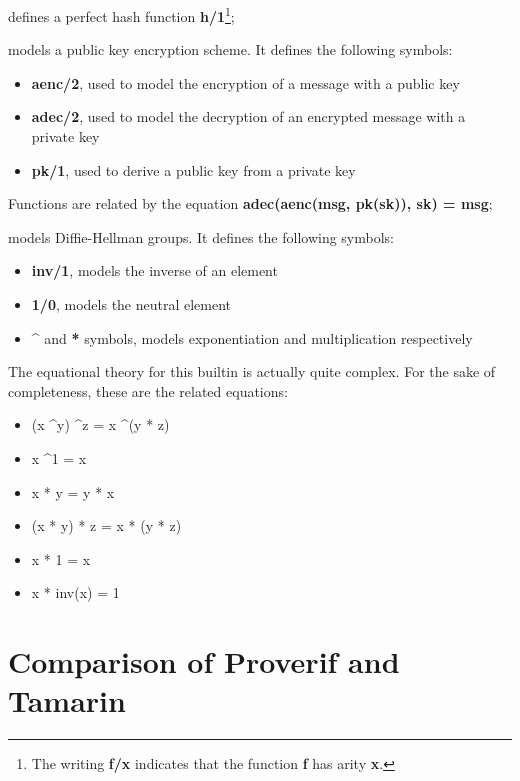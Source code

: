\begin{description}[style=nextline]
    \item[hashing] defines a perfect hash function \textbf{h/1}\footnote{The writing \textbf{f/x} indicates that the function \textbf{f} has arity \textbf{x}.};
    \item[asymmetric-encryption] models a public key encryption scheme. It defines the following symbols:
    
    \begin{itemize}
        \item{\textbf{aenc/2}, used to model the encryption of a message with a public key}
        \item{\textbf{adec/2}, used to model the decryption of an encrypted message with a private key}
        \item{\textbf{pk/1}, used to derive a public key from a private key}
    \end{itemize}

    Functions are related by the equation \textbf{adec(aenc(msg, pk(sk)), sk) = msg};

    \item[diffie-hellman] models Diffie-Hellman groups. It defines the following symbols:
    
    \begin{itemize}
        \item{\textbf{inv/1}, models the inverse of an element}
        \item{\textbf{1/0}, models the neutral element}
        \item{\textbf{\textasciicircum} and \textbf{*} symbols, models exponentiation and multiplication respectively}
    \end{itemize}

    The equational theory for this builtin is actually quite complex. For the sake of completeness, these are the related equations:
    \begin{itemize}
        \item{(x \textasciicircum y) \textasciicircum z = x \textasciicircum (y * z)}
        \item{x \textasciicircum 1 = x}
        \item{x * y = y * x}
        \item{(x * y) * z = x * (y * z)}
        \item{x * 1 = x}
        \item{x * inv(x) = 1}
    \end{itemize}
\end{description}

\section{Comparison of Proverif and Tamarin}